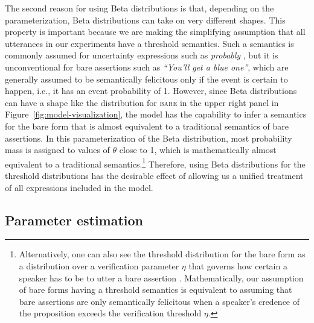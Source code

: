 \documentclass[man, floatsintext]{apa6}
\begin{document}
The second reason for using Beta distributions is that, depending on the parameterization, 
Beta distributions can take on very different shapes. This property is important because we are making
the simplifying assumption that all utterances in our experiments have a threshold semantics.
Such a semantics is commonly assumed for uncertainty expressions such as \textit{probably} \parencite[e.g.,][]{Yalcin2010,Lassiter2016}, 
but it is unconventional for bare assertions such as \textit{``You'll get a blue one''}, which are generally assumed to be  
semantically felicitous only if the event is certain to happen, i.e., it has an event probability of 1. However, since Beta distributions can have a shape 
like the distribution for \textsc{bare} in the upper right panel in Figure~\ref{fig:model-visualization}, the model has the capability to infer
a semantics for the bare form that is almost equivalent to a traditional semantics of bare assertions. In this parameterization of the
Beta distribution, most probability mass is assigned to values of $\theta$ close to 1, which is mathematically almost equivalent to
a traditional semantics.\footnote{Alternatively, one can also see the threshold distribution for the bare form as a distribution over a verification parameter $\eta$ that governs 
how certain a speaker has to be to utter a bare assertion \parencite[see, e.g.,][]{Moss2018}. Mathematically, our assumption of bare forms having a threshold
semantics is equivalent to assuming that bare assertions are only semantically felicitous when a speaker's credence of the proposition exceeds the verification threshold $\eta$.}
Therefore, using Beta distributions for the threshold distributions has the desirable effect of allowing us a unified treatment of all expressions included in the model. 

\subsection{Parameter estimation}
\end{document}
